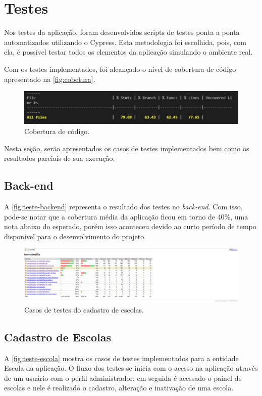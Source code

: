 \section{Testes}
Nos testes da aplicação, foram desenvolvidos scripts de testes ponta a ponta automatizados utilizando o Cypress. Esta metodologia foi escolhida, pois, com ela, é possível testar todos os elementos da aplicação simulando o ambiente real. 

Com os testes implementados, foi alcançado o nível de cobertura de código apresentado na \autoref{fig:cobetura}.

\begin{figure}[htb]
    \centering
	\includegraphics[width=16cm]{imagens/Coberturadetestes.JPG}
	\caption{\label{fig:cobetura} Cobertura de código.}
\end{figure}

Nesta seção, serão apresentados os casos de testes implementados bem como os resultados parciais de sua execução.
\subsection{Back-end}
A \autoref{fig:teste-backend} representa o resultado dos testes no \textit{\gls{back-end}}. Com isso, pode-se notar que a cobertura média da aplicação ficou em torno de 40\%, uma nota abaixo do esperado, porém isso aconteceu devido ao curto período de tempo disponível para o desenvolvimento do projeto.
\begin{figure}[htb]
    \centering
	\includegraphics[width=16cm]{imagens/TesteBackend.jpg}
	\caption{\label{fig:teste-backend} Casos de testes do cadastro de escolas.}
\end{figure}

\subsection{Cadastro de Escolas}
A \autoref{fig:teste-escola} mostra os casos de testes implementados para a entidade Escola da aplicação. O fluxo dos testes se inicia com o acesso na aplicação através de um usuário com o perfil administrador; em seguida é acessado o painel de escolas e nele é realizado o cadastro, alteração e inativação de uma escola.


